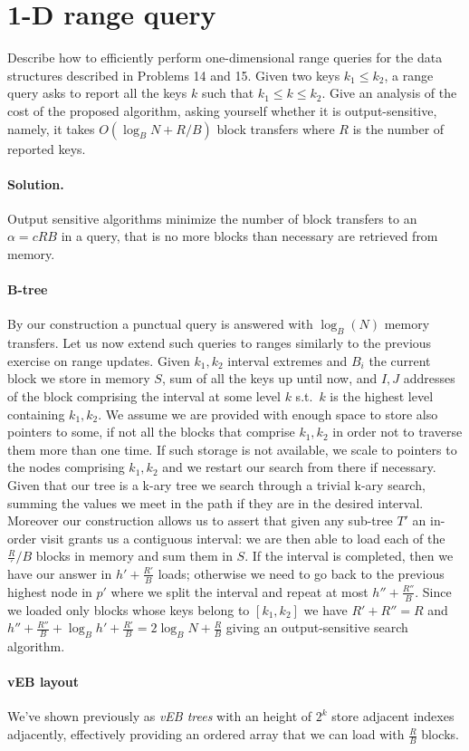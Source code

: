 \section{1-D range query}
Describe how to efficiently perform one-dimensional range queries for the data structures described in Problems 14 and 15. Given two keys $k_1 \leq k_2$, a range query asks to report all the keys $k$ such that $k_1 \leq k \leq k_2$. Give an analysis of the cost of the proposed algorithm, asking yourself whether it is output-sensitive, namely, it takes $O(\log_B N + R/B)$ block transfers where $R$ is the number of reported keys.

\vspace{0.5cm}
\paragraph{Solution.} Output sensitive algorithms minimize the number of block transfers to an $\alpha = c{R}{B}$ in a query, that is no more blocks than necessary are retrieved from memory.

\paragraph{B-tree}
By our construction a punctual query is answered with $\log_B(N)$ memory transfers.
Let us now extend such queries to ranges similarly to the previous exercise on range updates.
Given $k_1, k_2$ interval extremes and $B_i$ the current block we store in memory $S$, sum of all the keys up until now, and $I, J$ addresses of the block comprising the interval at some level $k$ s.t.\ $k$ is the highest level containing $k_1, k_2$.
We assume we are provided with enough space to store also pointers to some, if not all the blocks that comprise $k_1, k_2$ in order not to traverse them more than one time.
If such storage is not available, we scale to pointers to the nodes comprising $k_1, k_2$ and we restart our search from there if necessary.
Given that our tree is a k-ary tree we search through a trivial k-ary search, summing the values we meet in the path if they are in the desired interval.
Moreover our construction allows us to assert that given any sub-tree $T'$ an in-order visit grants us a contiguous interval: we are then able to load each of the $\frac{R}'/{B}$ blocks in memory and sum them in $S$.
If the interval is completed, then we have our answer in $h' + \frac{R'}{B}$ loads; otherwise we need to go back to the previous highest node in $p'$ where we split the interval and repeat at most $h'' + \frac{R''}{B}$.
Since we loaded only blocks whose keys belong to $[k_1, k_2]$ we have $R' + R'' = R$ and $h'' + \frac{R''}{B} + \log_B{h'} + \frac{R'}{B} = 2\log_B{N} + \frac{R}{B}$ giving an output-sensitive search algorithm.

\paragraph{vEB layout} We've shown previously as \emph{vEB trees} with an height of $2^k$ store adjacent indexes adjacently, effectively providing an ordered array that we can load with $\frac{R}{B}$ blocks.